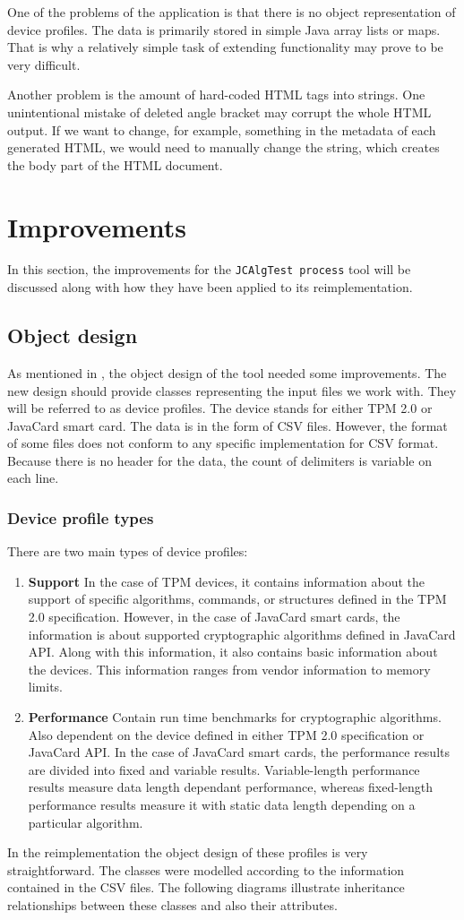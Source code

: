 One of the problems of the application is that there is no object representation of device profiles. The data is primarily stored in simple Java array lists or maps. That is why a relatively simple task of extending functionality may prove to be very difficult. 

Another problem is the amount of hard-coded HTML tags into strings. One unintentional mistake of deleted angle bracket may corrupt the whole HTML output. If we want to change, for example, something in the metadata of each generated HTML, we would need to manually change the string, which creates the body part of the HTML document. 

\section{Improvements}
In this section, the improvements for the \texttt{JCAlgTest process} tool will be discussed along with how they have been applied to its reimplementation.

\subsection{Object design}
As mentioned in , the object design of the tool needed some improvements. The new design should provide classes representing the input files we work with. They will be referred to as device profiles. The device stands for either TPM 2.0 or JavaCard smart card. The data is in the form of CSV files. However, the format of some files does not conform to any specific implementation for CSV format. Because there is no header for the data, the count of delimiters is variable on each line.

\subsubsection{Device profile types}
There are two main types of device profiles:
\begin{enumerate}
    \item \textbf{Support} In the case of TPM devices, it contains information about the support of specific algorithms, commands, or structures defined in the TPM 2.0 specification. However, in the case of JavaCard smart cards, the information is about supported cryptographic algorithms defined in JavaCard API. Along with this information, it also contains basic information about the devices. This information ranges from vendor information to memory limits.
    
    \item \textbf{Performance} Contain run time benchmarks for cryptographic algorithms. Also dependent on the device defined in either TPM 2.0 specification or JavaCard API. In the case of JavaCard smart cards, the performance results are divided into fixed and variable results. Variable-length performance results measure data length dependant performance, whereas fixed-length performance results measure it with static data length depending on a particular algorithm.
\end{enumerate}

In the reimplementation the object design of these profiles is very straightforward. The classes were modelled according to the information contained in the CSV files. The following diagrams illustrate inheritance relationships between these classes and also their attributes.


